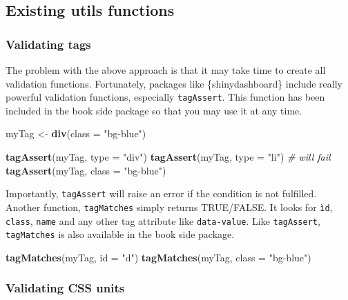 \documentclass[
]{book}
\newenvironment{Shaded}{\begin{snugshade}}{\end{snugshade}}
\newcommand{\CommentTok}[1]{\textcolor[rgb]{0.56,0.35,0.01}{\textit{#1}}}
\newcommand{\DataTypeTok}[1]{\textcolor[rgb]{0.13,0.29,0.53}{#1}}
\newcommand{\KeywordTok}[1]{\textcolor[rgb]{0.13,0.29,0.53}{\textbf{#1}}}
\newcommand{\NormalTok}[1]{#1}
\newcommand{\StringTok}[1]{\textcolor[rgb]{0.31,0.60,0.02}{#1}}
\begin{document}
\hypertarget{existing-utils-functions}{%
\subsection{Existing utils functions}\label{existing-utils-functions}}

\hypertarget{validating-tags}{%
\subsubsection{Validating tags}\label{validating-tags}}

The problem with the above approach is that it may take time to create all validation functions. Fortunately, packages like \{shinydashboard\} include really powerful validation functions, especially \texttt{tagAssert}. This function has been included in the book side package so that you may use it at any time.

\begin{Shaded}
\begin{Highlighting}[]
\NormalTok{myTag <-}\StringTok{ }\KeywordTok{div}\NormalTok{(}\DataTypeTok{class =} \StringTok{"bg-blue"}\NormalTok{)}

\KeywordTok{tagAssert}\NormalTok{(myTag, }\DataTypeTok{type =} \StringTok{"div"}\NormalTok{)}
\KeywordTok{tagAssert}\NormalTok{(myTag, }\DataTypeTok{type =} \StringTok{"li"}\NormalTok{) }\CommentTok{# will fail}
\KeywordTok{tagAssert}\NormalTok{(myTag, }\DataTypeTok{class =} \StringTok{"bg-blue"}\NormalTok{)}
\end{Highlighting}
\end{Shaded}

Importantly, \texttt{tagAssert} will raise an error if the condition is not fulfilled. Another function, \texttt{tagMatches} simply returns TRUE/FALSE. It looks for \texttt{ìd}, \texttt{class}, \texttt{name} and any other tag attribute like \texttt{data-value}. Like \texttt{tagAssert}, \texttt{tagMatches} is also available in the book side package.

\begin{Shaded}
\begin{Highlighting}[]
\KeywordTok{tagMatches}\NormalTok{(myTag, }\DataTypeTok{id =} \StringTok{"d"}\NormalTok{)}
\KeywordTok{tagMatches}\NormalTok{(myTag, }\DataTypeTok{class =} \StringTok{"bg-blue"}\NormalTok{)}
\end{Highlighting}
\end{Shaded}

\hypertarget{validating-css-units}{%
\subsubsection{Validating CSS units}\label{validating-css-units}}
\end{document}
